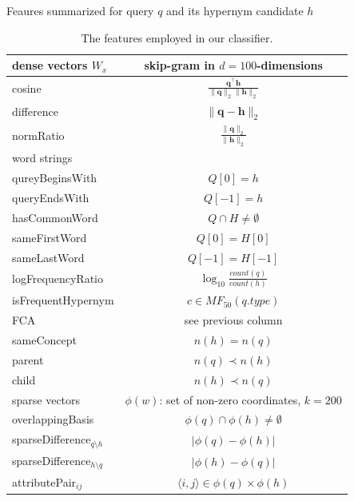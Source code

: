 \documentclass{beamer}
\newlength{\onecolwid}
\begin{document}
\begin{frame}[t]
\begin{columns}[t]
\begin{column}{\onecolwid}
    \bigskip
    \begin{block}{Feaures summarized}{ for query $q$ and its hypernym candidate $h$ }
      \begin{table}
        \begin{tabular}{lc}
          \toprule
          \alert{dense vectors $W_x$}   & skip-gram in $d=100$-dimensions
          \\ \midrule
          {cosine}            & $\frac{\mathbf{q}^\intercal \mathbf{h}}{\lVert \mathbf{q} \rVert_2\lVert \mathbf{h} \rVert_2}$ \\ %
          {difference}        & $\lVert \mathbf{q} - \mathbf{h} \rVert_2$ \\ %
          {normRatio}         & $\frac{\lVert \mathbf{q}\rVert_2}{\lVert
          \mathbf{h} \rVert_2}$ \\ %
          \midrule 
          \alert{word strings}   & \\ 
          \midrule
          {qureyBeginsWith}   & $Q[0] = h$ \\ %
          {queryEndsWith}     & $Q[-1] = h$ \\
          {hasCommonWord} & $Q \cap H \neq \emptyset$ \\ %
          {sameFirstWord}        & $Q[0] = H[0]$ \\ %
          {sameLastWord}        & $Q[-1] = H[-1]$ \\
          {logFrequencyRatio} & $\log_{10}\frac{count(q)}{count(h)}$ \\ %
          {isFrequentHypernym}\footnotemark & $c \in MF_{50}(q.type)$\\
          \midrule 
          \alert{FCA} & see previous column    \\ 
          \midrule
          sameConcept & $n(h)=n(q)$ \\
          parent  & $n(q)\prec n(h)$ \\
          child  & $n(h)\prec n(q)$ \\
          \midrule 
          \alert{sparse vectors}   &  $\phi(w)$: set of non-zero coordinates,
          $k=200$  \\
          \midrule
          {overlappingBasis}  & $\phi(q) \cap \phi(h) \neq \emptyset$ \\ %
          {sparseDifference$_{q\setminus h}$} & $\lvert \phi(q) - \phi(h) \rvert$ \\ %
          {sparseDifference$_{h\setminus q}$} & $\lvert \phi(h) - \phi(q) \rvert$ \\
          attributePair$_{ij}$      & $\langle i,j\rangle\in\phi(q)\times\phi(h)$ \\ %
          \bottomrule
        \end{tabular}
        \caption{The features employed in our classifier. \\
        }
        \label{table:core_features}
      \end{table}


\end{block}
\end{column}
\end{columns}
\end{frame}
\end{document}
